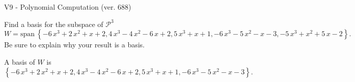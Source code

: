 \begin{exercise}
  \begin{exerciseTitle}V9 - Polynomial Computation (ver. 688)\end{exerciseTitle}
  \begin{exerciseStatement}
    Find a basis for the subspace of \(\mathcal{P}^3\) 
\[W=\mathrm{span}\ \left\{-6 \, x^{3} + 2 \, x^{2} + x + 2 , 4 \, x^{3} - 4 \, x^{2} - 6 \, x + 2 , 5 \, x^{3} + x + 1 , -6 \, x^{3} - 5 \, x^{2} - x - 3 , -5 \, x^{3} + x^{2} + 5 \, x - 2\right\}.\]
 Be sure to explain why your result is a basis.


  \end{exerciseStatement}
  \begin{exerciseAnswer}
   A basis of \(W\) is  \(\left\{-6 \, x^{3} + 2 \, x^{2} + x + 2 , 4 \, x^{3} - 4 \, x^{2} - 6 \, x + 2 , 5 \, x^{3} + x + 1 , -6 \, x^{3} - 5 \, x^{2} - x - 3\right\}\).
  


  \end{exerciseAnswer}
\end{exercise}